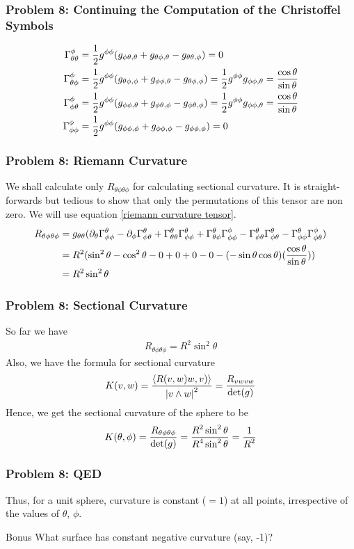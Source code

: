\begin{frame}
\frametitle{Problem 8: Continuing the Computation of the Christoffel Symbols}
\begin{align}
\Gamma^{\phi}_{\theta\theta}&=\frac{\displaystyle 1}{\displaystyle 2}g^{\phi\phi}(g_{\phi\theta ,\theta}+g_{\theta\phi ,\theta}-g_{\theta\theta ,\phi})=0\\
\Gamma^{\phi}_{\theta\phi}&=\frac{\displaystyle 1}{\displaystyle 2}g^{\phi\phi}(g_{\theta\phi ,\phi}+g_{\phi\phi ,\theta}-g_{\theta\phi ,\phi})=\frac{\displaystyle 1}{\displaystyle 2}g^{\phi\phi}g_{\phi\phi ,\theta}=\frac{\displaystyle \cos\theta}{\displaystyle \sin\theta}\\
\Gamma^{\phi}_{\phi\theta}&=\frac{\displaystyle 1}{\displaystyle 2}g^{\phi\phi}(g_{\phi\phi ,\theta}+g_{\phi\theta ,\phi}-g_{\phi\theta ,\phi})=\frac{\displaystyle 1}{\displaystyle 2}g^{\phi\phi}g_{\phi\phi ,\theta}=\frac{\displaystyle \cos\theta}{\displaystyle \sin\theta}\\
\Gamma^{\phi}_{\phi\phi}&=\frac{\displaystyle 1}{\displaystyle 2}g^{\phi\phi}(g_{\phi\phi ,\phi}+g_{\phi\phi ,\phi}-g_{\phi\phi ,\phi})=0
\end{align}
\end{frame}

\begin{frame}
\frametitle{Problem 8: Riemann Curvature}
We shall calculate only $R_{\theta\phi\theta\phi}$ for calculating sectional curvature. It is straight-forwards but tedious to show that only the permutations of this tensor are non zero. We will use equation \ref{riemann curvature tensor}.
\begin{align}
R_{\theta\phi\theta\phi}&=g_{\theta\theta}(\partial_{\theta}\Gamma^{\theta}_{\phi\phi}-\partial_{\phi}\Gamma^{\theta}_{\phi\theta}+\Gamma^{\theta}_{\theta\theta}\Gamma^{\theta}_{\phi\phi}+\Gamma^{\theta}_{\theta\phi}\Gamma^{\phi}_{\phi\phi}-\Gamma^{\theta}_{\phi\theta}\Gamma^{\theta}_{\phi\theta}-\Gamma^{\theta}_{\phi\phi}\Gamma^{\phi}_{\phi\theta})\\
&=R^2(\sin^2\theta-\cos^2\theta-0+0+0-0-(-\sin\theta\cos\theta)(\frac{\displaystyle \cos\theta}{\displaystyle \sin\theta}))\\
&=R^2\sin^2\theta
\end{align}
\end{frame}

\begin{frame}
\frametitle{Problem 8: Sectional Curvature}
So far we have
\begin{align}
R_{\theta\phi\theta\phi}=R^2\sin^2\theta
\end{align}
Also, we have the formula for sectional curvature
\begin{align}
K(v,w)=\frac{\displaystyle \left\langle R(v,w)w,v) \right\rangle}{\displaystyle \left\lvert v\wedge w \right\rvert^2}=\frac{\displaystyle R_{vwvw}}{\displaystyle \det(g)}
\end{align}
Hence, we get the sectional curvature of the sphere to be
\begin{align}
K(\theta,\phi)=\frac{\displaystyle R_{\theta\phi\theta\phi}}{\displaystyle \det(g)}=\frac{\displaystyle R^2\sin^2\theta}{\displaystyle R^4\sin^2\theta}=\frac{\displaystyle 1}{\displaystyle R^2}
\end{align}
\end{frame}

\begin{frame}
\frametitle{Problem 8: QED}
Thus, for a unit sphere, curvature is constant ($=1$) at all points, irrespective of the values of $\theta$, $\phi$.\\ \pause
\begin{block}{Bonus}
What surface has constant negative curvature (say, -1)?
\end{block}

\end{frame}

